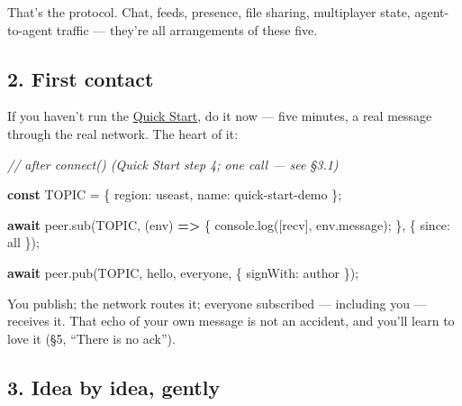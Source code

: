 \documentclass[
  nobib]{tufte-handout}
\newenvironment{Shaded}{}{}
\newcommand{\AttributeTok}[1]{\textcolor[rgb]{0.49,0.56,0.16}{#1}}
\newcommand{\BuiltInTok}[1]{\textcolor[rgb]{0.00,0.50,0.00}{#1}}
\newcommand{\CommentTok}[1]{\textcolor[rgb]{0.38,0.63,0.69}{\textit{#1}}}
\newcommand{\ControlFlowTok}[1]{\textcolor[rgb]{0.00,0.44,0.13}{\textbf{#1}}}
\newcommand{\DataTypeTok}[1]{\textcolor[rgb]{0.56,0.13,0.00}{#1}}
\newcommand{\FunctionTok}[1]{\textcolor[rgb]{0.02,0.16,0.49}{#1}}
\newcommand{\KeywordTok}[1]{\textcolor[rgb]{0.00,0.44,0.13}{\textbf{#1}}}
\newcommand{\NormalTok}[1]{#1}
\newcommand{\OperatorTok}[1]{\textcolor[rgb]{0.40,0.40,0.40}{#1}}
\newcommand{\StringTok}[1]{\textcolor[rgb]{0.25,0.44,0.63}{#1}}
\begin{document}
That's the protocol. Chat, feeds, presence, file sharing, multiplayer
state, agent-to-agent traffic --- they're all arrangements of these
five.

\subsection{2. First contact}\label{first-contact}

If you haven't run the \href{Quick-Start-v4.16.1.md}{Quick Start}, do it
now --- five minutes, a real message through the real network. The heart
of it:

\begin{Shaded}
\begin{Highlighting}[]
\CommentTok{// after connect() (Quick Start step 4; one call — see §3.1)}

\KeywordTok{const}\NormalTok{ TOPIC }\OperatorTok{=}\NormalTok{ \{ }\DataTypeTok{region}\OperatorTok{:} \StringTok{\textquotesingle{}useast\textquotesingle{}}\OperatorTok{,} \DataTypeTok{name}\OperatorTok{:} \StringTok{\textquotesingle{}quick{-}start{-}demo\textquotesingle{}}\NormalTok{ \}}\OperatorTok{;}

\ControlFlowTok{await}\NormalTok{ peer}\OperatorTok{.}\FunctionTok{sub}\NormalTok{(TOPIC}\OperatorTok{,}\NormalTok{ (env) }\KeywordTok{=\textgreater{}}\NormalTok{ \{}
  \BuiltInTok{console}\OperatorTok{.}\FunctionTok{log}\NormalTok{(}\StringTok{\textquotesingle{}[recv]\textquotesingle{}}\OperatorTok{,}\NormalTok{ env}\OperatorTok{.}\AttributeTok{message}\NormalTok{)}\OperatorTok{;}
\NormalTok{\}}\OperatorTok{,}\NormalTok{ \{ }\DataTypeTok{since}\OperatorTok{:} \StringTok{\textquotesingle{}all\textquotesingle{}}\NormalTok{ \})}\OperatorTok{;}

\ControlFlowTok{await}\NormalTok{ peer}\OperatorTok{.}\FunctionTok{pub}\NormalTok{(TOPIC}\OperatorTok{,} \StringTok{\textquotesingle{}hello, everyone\textquotesingle{}}\OperatorTok{,}\NormalTok{ \{ }\DataTypeTok{signWith}\OperatorTok{:}\NormalTok{ author \})}\OperatorTok{;}
\end{Highlighting}
\end{Shaded}

You publish; the network routes it; everyone subscribed --- including
you --- receives it. That echo of your own message is not an accident,
and you'll learn to love it (§5, ``There is no ack'').

\subsection{3. Idea by idea, gently}\label{idea-by-idea-gently}
\end{document}
